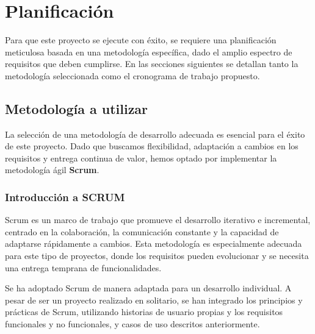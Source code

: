\chapter{Planificación}

Para que este proyecto se ejecute con éxito, se requiere una planificación meticulosa basada en una metodología específica, dado el amplio espectro de requisitos que deben cumplirse. En las secciones siguientes se detallan tanto la metodología seleccionada como el cronograma de trabajo propuesto.

\section{Metodología a utilizar}
La selección de una metodología de desarrollo adecuada es esencial para el éxito de este proyecto. Dado que buscamos flexibilidad, adaptación a cambios en los requisitos y entrega continua de valor, hemos optado por implementar la metodología ágil \textbf{Scrum}.

\subsection{Introducción a SCRUM}

Scrum es un marco de trabajo que promueve el desarrollo iterativo e incremental, centrado en la colaboración, la comunicación constante y la capacidad de adaptarse rápidamente a cambios. Esta metodología es especialmente adecuada para este tipo de proyectos, donde los requisitos pueden evolucionar y se necesita una entrega temprana de funcionalidades.

Se ha adoptado Scrum de manera adaptada para un desarrollo individual. A pesar de ser un proyecto realizado en solitario, se han integrado los principios y prácticas de Scrum, utilizando historias de usuario propias y los requisitos funcionales y no funcionales, y casos de uso descritos anteriormente.

